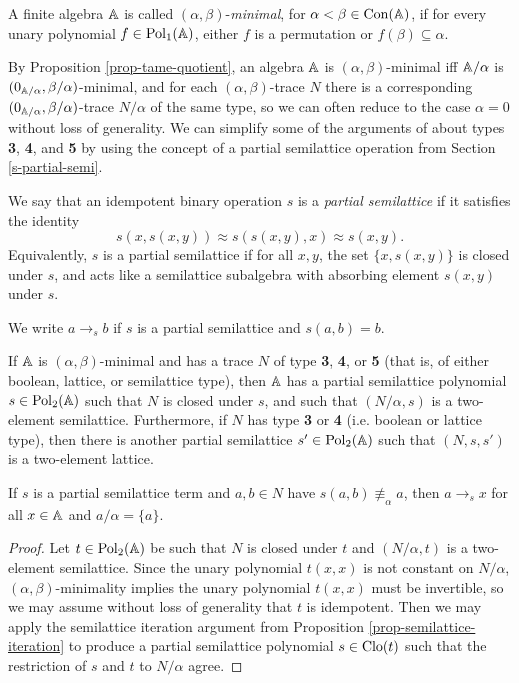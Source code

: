 \begin{appendices}
\begin{defn} A finite algebra $\mathbb{A}$ is called $(\alpha,\beta)$-\emph{minimal}, for $\alpha < \beta \in \operatorname{Con}(\mathbb{A})$, if for every unary polynomial $f \in \operatorname{Pol}_1(\mathbb{A})$, either $f$ is a permutation or $f(\beta) \subseteq \alpha$.
\end{defn}

By Proposition \ref{prop-tame-quotient}, an algebra $\mathbb{A}$ is $(\alpha,\beta)$-minimal iff $\mathbb{A}/\alpha$ is $(0_{\mathbb{A}/\alpha}, \beta/\alpha)$-minimal, and for each $(\alpha,\beta)$-trace $N$ there is a corresponding $(0_{\mathbb{A}/\alpha},\beta/\alpha)$-trace $N/\alpha$ of the same type, so we can often reduce to the case $\alpha = 0$ without loss of generality. We can simplify some of the arguments of \cite{hobby-mckenzie} about types \textbf{3}, \textbf{4}, and \textbf{5} by using the concept of a partial semilattice operation from Section \ref{s-partial-semi}.

\begin{defn} We say that an idempotent binary operation $s$ is a \emph{partial semilattice} if it satisfies the identity
\[
s(x,s(x,y)) \approx s(s(x,y),x) \approx s(x,y).
\]
Equivalently, $s$ is a partial semilattice if for all $x,y$, the set $\{x,s(x,y)\}$ is closed under $s$, and acts like a semilattice subalgebra with absorbing element $s(x,y)$ under $s$.

We write $a \rightarrow_s b$ if $s$ is a partial semilattice and $s(a,b) = b$.
\end{defn}

\begin{prop}\label{prop-tame-partial-semi} If $\mathbb{A}$ is $(\alpha,\beta)$-minimal and has a trace $N$ of type \textbf{3}, \textbf{4}, or \textbf{5} (that is, of either boolean, lattice, or semilattice type), then $\mathbb{A}$ has a partial semilattice polynomial $s \in \operatorname{Pol}_2(\mathbb{A})$ such that $N$ is closed under $s$, and such that $(N/\alpha, s)$ is a two-element semilattice. Furthermore, if $N$ has type  \textbf{3} or \textbf{4} (i.e. boolean or lattice type), then there is another partial semilattice $s' \in \operatorname{Pol}_2(\mathbb{A})$ such that $(N, s, s')$ is a two-element lattice.

If $s$ is a partial semilattice term and $a,b \in N$ have $s(a,b) \not\equiv_\alpha a$, then $a \rightarrow_s x$ for all $x \in \mathbb{A}$ and $a/\alpha = \{a\}$.
\end{prop}
\begin{proof} Let $t \in \operatorname{Pol}_2(\mathbb{A})$ be such that $N$ is closed under $t$ and $(N/\alpha, t)$ is a two-element semilattice. Since the unary polynomial $t(x,x)$ is not constant on $N/\alpha$, $(\alpha,\beta)$-minimality implies the unary polynomial $t(x,x)$ must be invertible, so we may assume without loss of generality that $t$ is idempotent. Then we may apply the semilattice iteration argument from Proposition \ref{prop-semilattice-iteration} to produce a partial semilattice polynomial $s \in \operatorname{Clo}(t)$ such that the restriction of $s$ and $t$ to $N/\alpha$ agree.


\end{proof}
\end{appendices}

